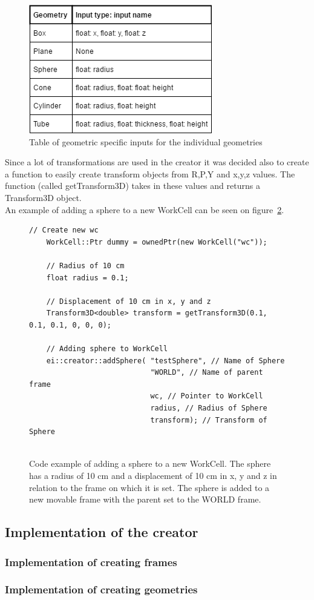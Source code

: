 \begin{figure}[h]
	\centering
	\includegraphics[scale=0.55]{Figures/InputsForGeoms.png}
	\caption{Table of geometric specific inputs for the individual geometries}
	\label{fig:InputsForGeoms}
\end{figure}

Since a lot of transformations are used in the creator it was decided also to create a function to easily create transform objects from R,P,Y and x,y,z values. The function (called getTransform3D) takes in these values and returns a Transform3D object.\\

An example of adding a sphere to a new WorkCell can be seen on figure~\ref{fig:CodeExampleAddSphere}.

\begin{figure}[h]
	\centering
	\lstset{language=C++} 
	\begin{lstlisting}[frame=single]
	// Create new wc
	WorkCell::Ptr dummy = ownedPtr(new WorkCell("wc"));
	 
	// Radius of 10 cm
	float radius = 0.1;
	
	// Displacement of 10 cm in x, y and z
	Transform3D<double> transform = getTransform3D(0.1, 0.1, 0.1, 0, 0, 0); 
	
	// Adding sphere to WorkCell
	ei::creator::addSphere( "testSphere", // Name of Sphere
							"WORLD", // Name of parent frame
							wc, // Pointer to WorkCell
							radius, // Radius of Sphere
							transform); // Transform of Sphere
	 
	\end{lstlisting}
	\caption{Code example of adding a sphere to a new WorkCell. The sphere has a radius of 10 cm and a displacement of 10 cm in x, y and z in relation to the frame on which it is set. The sphere is added to a new movable frame with the parent set to the WORLD frame.}
	\label{fig:CodeExampleAddSphere}
\end{figure}

\subsection{Implementation of the creator}

\subsubsection{Implementation of creating frames}

\subsubsection{Implementation of creating geometries}
